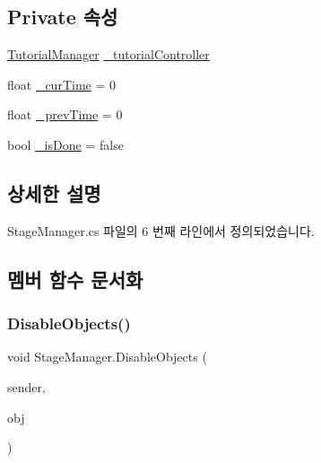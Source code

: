 \subsection*{Private 속성}
\begin{DoxyCompactItemize}
\item 
\mbox{\hyperlink{class_tutorial_manager}{Tutorial\+Manager}} \mbox{\hyperlink{class_stage_manager_a89bcfa1a4d5ca6a9135dfe051b4695a8}{\+\_\+tutorial\+Controller}}
\item 
float \mbox{\hyperlink{class_stage_manager_a4796557b8f0bab78b236b17d5963a662}{\+\_\+cur\+Time}} = 0
\item 
float \mbox{\hyperlink{class_stage_manager_ab61fe24b15151c1255c90f1a7f2aab23}{\+\_\+prev\+Time}} = 0
\item 
bool \mbox{\hyperlink{class_stage_manager_aa20febcb86c58404afa0f580f98c48ca}{\+\_\+is\+Done}} = false
\end{DoxyCompactItemize}


\subsection{상세한 설명}


Stage\+Manager.\+cs 파일의 6 번째 라인에서 정의되었습니다.



\subsection{멤버 함수 문서화}
\mbox{\label{class_stage_manager_a1b43416bf411137f34909060d4325ec7}} 
\subsubsection{\texorpdfstring{DisableObjects()}{DisableObjects()}}
{\footnotesize\ttfamily void Stage\+Manager.\+Disable\+Objects (\begin{DoxyParamCaption}\item[{\mbox{\hyperlink{class_u_i}{UI}}}]{sender,  }\item[{Game\+Object \mbox{[}$\,$\mbox{]}}]{obj }\end{DoxyParamCaption})\hspace{0.3cm}{\ttfamily [private]}}



